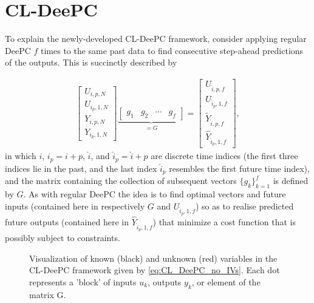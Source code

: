 \section{\acl{CL-DeePC}}
To explain the newly-developed \acf{CL-DeePC} framework, consider applying regular \ac{DeePC} $f$ times to the same past data to find consecutive step-ahead predictions of the outputs. This is succinctly described by

\begin{align}\label{eq:CL_DeePC_no_IVs}
\begin{bmatrix}
    U_{i,p,N}\\U_{i_p,1,N}\\Y_{i,p,N}\\ \hline Y_{i_p,1,N}
\end{bmatrix}
\underbrace{
\begin{bmatrix}
    g_1 & g_2 & \cdots & g_f
\end{bmatrix}}_{= G} =
\begin{bmatrix}
    U_{\hat{i},p,f}\\
    U_{\hat{i}_p,1,f}\\
    \widetilde{Y}_{\hat{i},p,f}\\
    \hline
    \widehat{Y}_{\hat{i}_p,1,f}
\end{bmatrix},
\end{align}
in which $i$, $i_p=i+p$, $\hat{i}$, and $\hat{i}_p=\hat{i}+p$ are discrete time indices (the first three indices lie in the past, and the last index $\hat{i}_p$ resembles the first future time index), and the matrix containing the collection of subsequent vectors $\{g_k\}^f_{k=1}$ is defined by $G$. As with regular \ac{DeePC} the idea is to find optimal vectors and future inputs (contained here in respectively $G$ and $U_{\hat{i}_p,1,f}$) so as to realise predicted future outputs (contained here in $\widehat{Y}_{\hat{i}_p,1,f}$) that minimize a cost function that is possibly subject to constraints.

\begin{figure}[b!]
\centering

\caption{Visualization of known (black) and unknown (red) variables in the \ac{CL-DeePC} framework given by \ref{eq:CL_DeePC_no_IVs}. Each dot represents a 'block' of inputs $u_k$, outputs $y_k$, or element of the matrix G.}
\label{fig:CL-DeePC}
\end{figure}
